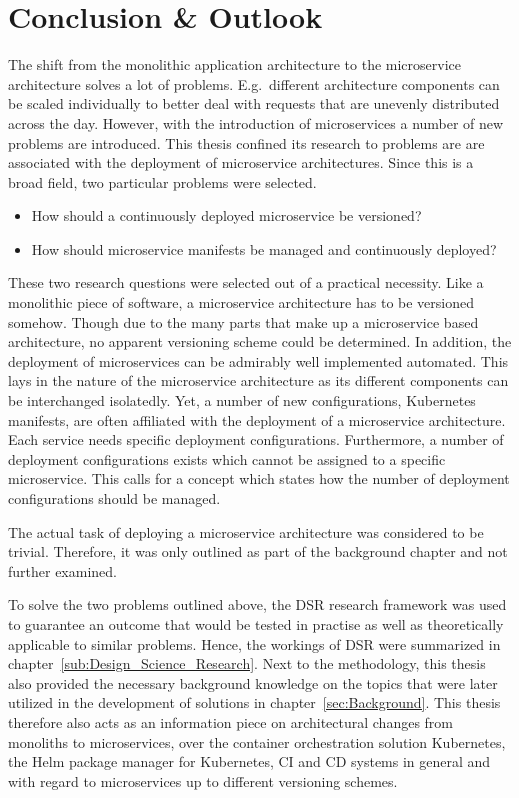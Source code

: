 
\section{Conclusion \& Outlook}%
\label{sec:Conclusion}

The shift from the monolithic application architecture to the microservice
architecture solves a lot of problems. E.g.\ different architecture components
can be scaled individually to better deal with requests that are unevenly
distributed across the day. However, with the introduction of microservices a
number of new problems are introduced. This thesis confined its research to
problems are are associated with the deployment of microservice architectures.
Since this is a broad field, two particular problems were selected.

\begin{itemize}
  \item How should a continuously deployed microservice be versioned?
  \item How should microservice manifests be managed and continuously deployed?
\end{itemize}

These two research questions were selected out of a practical necessity. Like a
monolithic piece of software, a microservice architecture has to be versioned
somehow. Though due to the many parts that make up a microservice based
architecture, no apparent versioning scheme could be determined. In addition,
the deployment of microservices can be admirably well implemented automated.
This lays in the nature of the microservice architecture as its different
components can be interchanged isolatedly. Yet, a number of new configurations,
Kubernetes manifests, are often affiliated with the deployment of a
microservice architecture. Each service needs specific deployment
configurations. Furthermore, a number of deployment configurations exists which
cannot be assigned to a specific microservice. This calls for a concept which
states how the number of deployment configurations should be managed.

The actual task of deploying a microservice architecture was considered to be
trivial. Therefore, it was only outlined as part of the background chapter and
not further examined.

To solve the two problems outlined above, the \ac{DSR} research framework was
used to guarantee an outcome that would be tested in practise as well as
theoretically applicable to similar problems. Hence, the workings of \ac{DSR}
were summarized in chapter~\ref{sub:Design_Science_Research}. Next to the
methodology, this thesis also provided the necessary background knowledge on the
topics that were later utilized in the development of solutions in
chapter~\ref{sec:Background}. This thesis therefore also acts as an information
piece on architectural changes from monoliths to microservices, over the
container orchestration solution Kubernetes, the Helm package manager for
Kubernetes, \ac{CI} and \ac{CD} systems in general and with regard to
microservices up to different versioning schemes.

